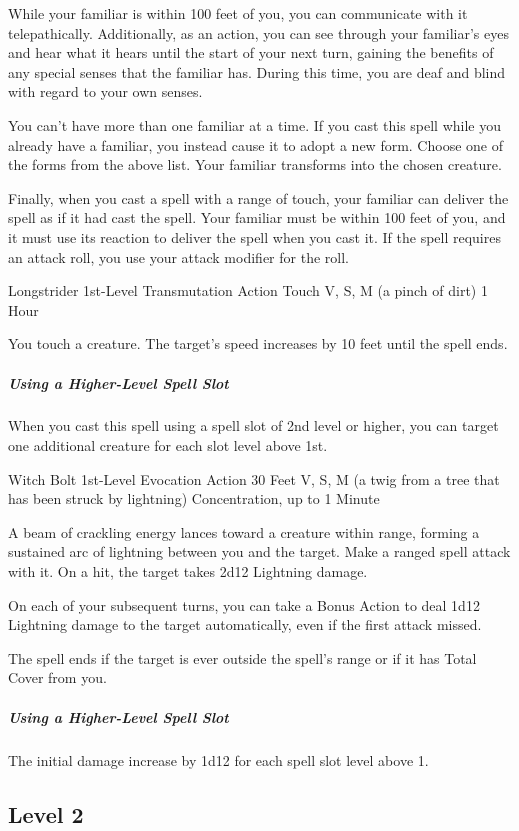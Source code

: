\documentclass[letterpaper,openany,oneside,twocolumn]{book}
\begin{document}
While your familiar is within 100 feet of you, you can communicate with it telepathically. Additionally, as an action, you can see through your familiar's eyes and hear what it hears until the start of your next turn, gaining the benefits of any special senses that the familiar has. During this time, you are deaf and blind with regard to your own senses.

You can't have more than one familiar at a time. If you cast this spell while you already have a familiar, you instead cause it to adopt a new form. Choose one of the forms from the above list. Your familiar transforms into the chosen creature.

Finally, when you cast a spell with a range of touch, your familiar can deliver the spell as if it had cast the spell. Your familiar must be within 100 feet of you, and it must use its reaction to deliver the spell when you cast it. If the spell requires an attack roll, you use your attack modifier for the roll.

\DndSpellHeader
  {Longstrider}
  {1st-Level Transmutation}
  {Action}
  {Touch}
  {V, S, M (a pinch of dirt)}
  {1 Hour}

You touch a creature. The target's speed increases by 10 feet until the spell ends.

\subparagraph*{Using a Higher-Level Spell Slot} When you cast this spell using a spell slot of 2nd level or higher, you can target one additional creature for each slot level above 1st.

\DndSpellHeader
  {Witch Bolt}
  {1st-Level Evocation}
  {Action}
  {30 Feet}
  {V, S, M (a twig from a tree that has been struck by lightning)}
  {Concentration, up to 1 Minute}

A beam of crackling energy lances toward a creature within range, forming a sustained arc of lightning between you and the target. Make a ranged spell attack with it. On a hit, the target takes 2d12 Lightning damage.

On each of your subsequent turns, you can take a Bonus Action to deal 1d12 Lightning damage to the target automatically, even if the first attack missed.

The spell ends if the target is ever outside the spell's range or if it has Total Cover from you.

\subparagraph*{Using a Higher-Level Spell Slot} The initial damage increase by 1d12 for each spell slot level above 1.

\subsection*{Level 2}
\end{document}
